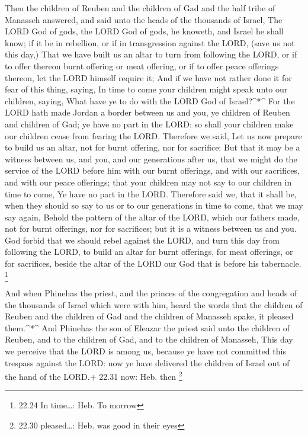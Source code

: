  Then the children of Reuben and the children of Gad and
the half tribe of Manasseh answered, and said unto the heads of the
thousands of Israel,  The LORD God of gods, the LORD God of
gods, he knoweth, and Israel he shall know; if it be in rebellion, or if
in transgression against the LORD, (save us not this day,) 
That we have built us an altar to turn from following the LORD, or if to
offer thereon burnt offering or meat offering, or if to offer peace
offerings thereon, let the LORD himself require it;  And if
we have not rather done it for fear of this thing, saying, In time to
come your children might speak unto our children, saying, What have ye
to do with the LORD God of Israel?\^{}*\^{}  For the LORD
hath made Jordan a border between us and you, ye children of Reuben and
children of Gad; ye have no part in the LORD: so shall your children
make our children cease from fearing the LORD.  Therefore
we said, Let us now prepare to build us an altar, not for burnt
offering, nor for sacrifice:  But that it may be a witness
between us, and you, and our generations after us, that we might do the
service of the LORD before him with our burnt offerings, and with our
sacrifices, and with our peace offerings; that your children may not say
to our children in time to come, Ye have no part in the LORD.
 Therefore said we, that it shall be, when they should so
say to us or to our generations in time to come, that we may say again,
Behold the pattern of the altar of the LORD, which our fathers made, not
for burnt offerings, nor for sacrifices; but it is a witness between us
and you.  God forbid that we should rebel against the LORD,
and turn this day from following the LORD, to build an altar for burnt
offerings, for meat offerings, or for sacrifices, beside the altar of
the LORD our God that is before his tabernacle. \footnote{22.24 In
  time\ldots: Heb. To morrow}

 And when Phinehas the priest, and the princes of the
congregation and heads of the thousands of Israel which were with him,
heard the words that the children of Reuben and the children of Gad and
the children of Manasseh spake, it pleased them.\^{}*\^{} 
And Phinehas the son of Eleazar the priest said unto the children of
Reuben, and to the children of Gad, and to the children of Manasseh,
This day we perceive that the LORD is among us, because ye have not
committed this trespass against the LORD: now ye have delivered the
children of Israel out of the hand of the LORD.+ 22.31 now: Heb. then
\footnote{22.30 pleased\ldots: Heb. was good in their eyes}

